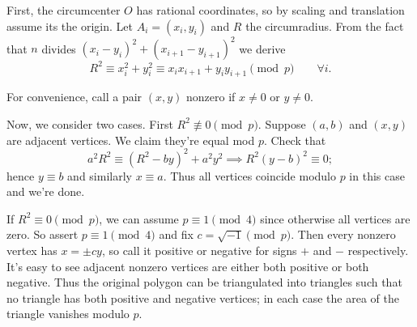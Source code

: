 First, the circumcenter $O$ has rational coordinates,
so by scaling and translation assume its the origin.
Let $A_i = (x_i, y_i)$ and $R$ the circumradius.
From the fact that $n$ divides $(x_i-y_i)^2 + (x_{i+1}-y_{i+1})^2$ we derive
\[ R^2 \equiv x_i^2 + y_i^2
  \equiv x_i x_{i+1} + y_i y_{i+1} \pmod p \qquad \forall i. \]

For convenience, call a pair $(x,y)$ nonzero if $x \neq 0$ or $y \neq 0$.

Now, we consider two cases.
First $R^2 \not\equiv 0 \pmod p$.
Suppose $(a,b)$ and $(x,y)$ are adjacent vertices.
We claim they're equal mod $p$.
Check that \[ a^2R^2 \equiv (R^2-by)^2 + a^2y^2 \implies R^2(y-b)^2 \equiv 0; \]
hence $y \equiv b$ and similarly $x \equiv a$.
Thus all vertices coincide modulo $p$ in this case and we're done.

If $R^2 \equiv 0 \pmod p$,
we can assume $p \equiv 1 \pmod 4$ since otherwise all vertices are zero.
So assert $p \equiv 1 \pmod 4$ and fix $c = \sqrt{-1} \pmod p$.
Then every nonzero vertex has $x = \pm cy$,
so call it positive or negative for signs $+$ and $-$ respectively.
It's easy to see adjacent nonzero vertices are either both positive or both negative.
Thus the original polygon can be triangulated into triangles
such that no triangle has both positive and negative vertices;
in each case the area of the triangle vanishes modulo $p$.

